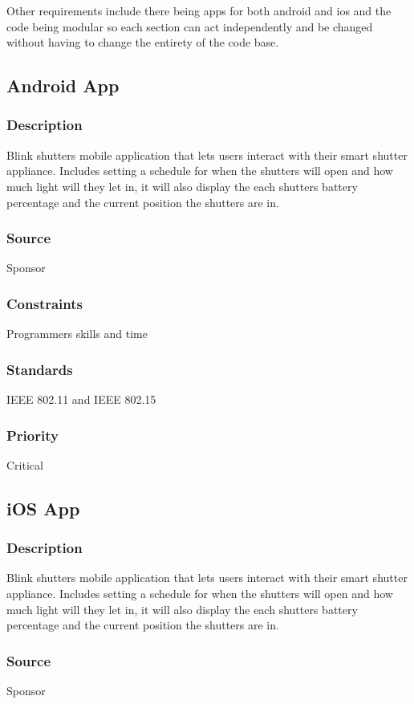 Other requirements include there being apps for both android and ios and the code being modular so each section can act independently and be changed without having to change the entirety of the code base.

\subsection{Android App}
\subsubsection{Description}
Blink shutters mobile application that lets users interact with their smart shutter appliance. Includes setting a schedule for when the shutters will open and how much light will they let in, it will also display the each shutters battery percentage and the current position the shutters are in.
\subsubsection{Source}
Sponsor
\subsubsection{Constraints}
Programmers skills and time
\subsubsection{Standards}
IEEE 802.11 and IEEE 802.15
\subsubsection{Priority}
Critical

\subsection{iOS App}
\subsubsection{Description}
Blink shutters mobile application that lets users interact with their smart shutter appliance. Includes setting a schedule for when the shutters will open and how much light will they let in, it will also display the each shutters battery percentage and the current position the shutters are in.

\subsubsection{Source}
Sponsor
